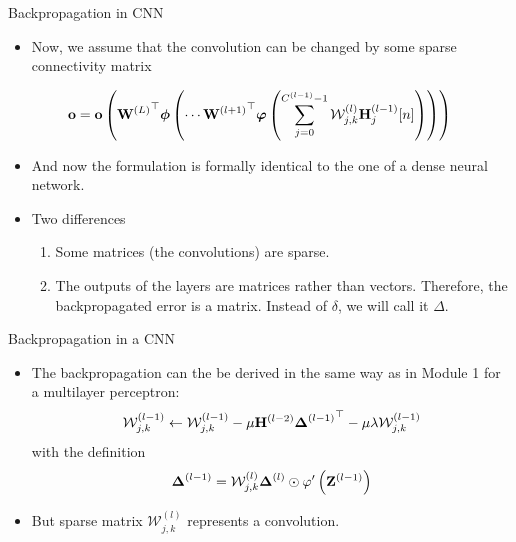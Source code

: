 \documentclass{beamer}
\begin{document}
\begin{frame}{Backpropagation in CNN}
\begin{itemize}
\item Now, we assume that the convolution can be changed by some sparse connectivity matrix
\end{itemize}

\begin{equation}
    {\bf o} = {\bf o}\left({{\bf W}^{(L)}}^\top\boldsymbol{\mathit{\phi}}\left(\cdots{{\bf W}^{(l+1)}}^\top{\boldsymbol \varphi}\left(\sum_{j=0}^{C^{(l-1)}-1} \mathcal{W}^{(l)}_{j,k}  {\bf H}^{(l-1)}_j[n] \right)\right)\right)
\end{equation}


\begin{itemize}
    \item And now the formulation is formally identical to the one of a dense neural network. 
    \item Two differences
    \begin{enumerate}
        \item Some matrices (the convolutions) are sparse.
        \item The outputs of the layers are matrices rather than vectors. Therefore, the backpropagated error is a matrix. Instead of $\delta$, we will call it $\Delta$. 
    \end{enumerate}
\end{itemize}
\end{frame}
\begin{frame}{Backpropagation in a CNN}

\begin{itemize}
\item The backpropagation can the be derived in the same way as in Module 1 for a multilayer perceptron:
\begin{equation}\label{eq:bp_update_CNN}
    \mathcal{W}^{(l-1)}_{j,k} \leftarrow  \mathcal{W}^{(l-1)}_{j,k} - \mu   {{\bf H}^{(l-2)}} {{\boldsymbol \Delta}^{(l-1)}}^\top - \mu \lambda \mathcal{W}^{(l-1)}_{j,k}
\end{equation}
with the definition  
\begin{equation}\label{eq:general_error_term_CNN}
    {\boldsymbol \Delta}^{(l-1)} = \mathcal{W}_{j,k}^ {(l)}{\boldsymbol \Delta}^{(l)}\odot
    \varphi'\left({\bf Z}^{(l-1)}\right)
\end{equation}
\item But sparse matrix $\mathcal{W}_{j,k}^ {(l)}$ represents a convolution.
\end{itemize}
\end{frame}
\end{document}
